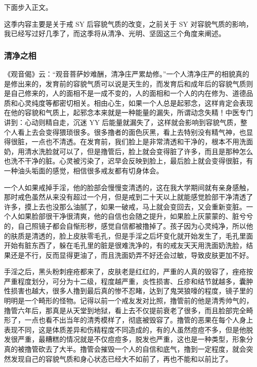 下面步入正文。

这季内容主要是关于戒 SY 后容貌气质的改变，之前关于 SY 对容貌气质的影响，我已经写过好几季了，而这季将从清净、光明、坚固这三个角度来阐述。

\subsubsection{清净之相}

《观音偈》云：“观音菩萨妙难酬，清净庄严累劫修。”一个人清净庄严的相貌真的是修出来的，发育前的容貌气质可以说是天生的，而发育后和成年后的容貌气质则是自己修来的，人的面相不是一成不变的，人的面相和一个人的内在修为、道德品质和心灵纯度等都密切相关。相由心生，如果一个人总是起邪念，这样肯定会表现在他的容貌和气质上，起邪念本来就是一种能量的漏失，所谓动念失精！中医专门讲到：心动则精自走，沉迷 YY 后能量就漏失了，这样就会影响到容貌气质，整个人看上去会变得猥琐很多。很多撸者的面色灰黑，看上去特别没有精气神，也显得很脏，一点也不清透。在发育前，我们脸上是非常清透和干净的，根本不用洗面奶，用清水洗脸就可以了，但是撸管后，脸上就会变得脏了许多，而且是那种怎么也洗不干净的脏。心灵被污染了，迟早会反映到脸上，最后脸上就会变得很脏，有一种油头垢面的感觉，相信很多戒友都有切身体会。

一个人如果戒掉手淫，他的脸部会慢慢变清透的，这在我大学期间就有亲身感触，那时戒色虽然从来没有超过一个月，但是戒到二十天以上就能感觉脸部干净清透了许多，摸上去也没那么油腻了，如果一破戒，马上就会变回去，又会重新变脏。一个人如果脸部很干净很清爽，他的自信也会随之提升，如果脸上灰蒙蒙的、脏兮兮的，自己照镜子都会自惭形秽，感觉自信都被撸掉了。孩子因为心灵纯净，所以他的肤质是清透的，脸上皮肤零毛孔，但是手淫之后坏变化就开始发生了，毛孔里面开始有脏东西了，躲在毛孔里的脏是很难洗净的，有的戒友天天用洗面奶洗脸，结果还是不行，反而显得更油了，而且洗面奶弄不好还会过敏，导致皮肤更加不好。

手淫之后，黑头粉刺痤疮都来了，皮肤老是红红的，严重的人真的毁容了，痤疮按严重程度划分，可分为十二级，程度越严重，炎性损害、丘疹和结节就越多，囊肿性损害也越大，很多人撸到最后真的惨不忍睹，达到了鬼哭狼嚎的程度，镜子里的明明是一个畸形的怪物。记得以前一个戒友发对比照，撸管前的他是清秀帅气的，撸管六年后，那真是从天堂到地狱，看上去不仅提前衰老了很多，而且脸部完全畸形了，一点也看不出当年的清秀模样了，彻底被毁容了。撸管的恶果在每个人身上表现不同，这是体质差异和伤精程度不同造成的，有的人虽然痘痘不多，但是他脱发很严重，最糟糕的情况就是不仅痘痘多，脱发也严重，这也是一种类型，形象分真的被撸管砍去了大半。撸管会摧毁一个人的自信和底气，撸到一定程度，就会突然发现自己的容貌气质和身心状态已经大不如前了，再也不能和以前比了。


